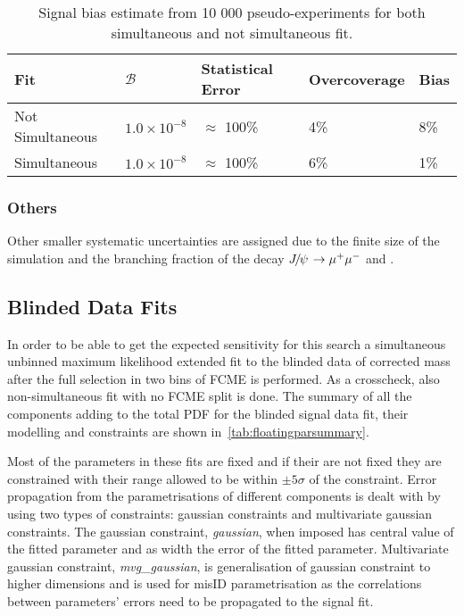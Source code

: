 \begin{table}[H]
\begin{center}
\begin{tabular}{| l | l | l | l | l |}
\hline
        Fit & $\mathcal{B}$ & Statistical Error & Overcoverage & Bias \\
\hline
        Not Simultaneous  & $1.0\times 10^{-8}$ & $\approx$ 100\% & 4\% & 8\%   \\
        Simultaneous  & $1.0\times 10^{-8}$ & $\approx$ 100\% & 6\% & 1\%   \\
\hline
\end{tabular}
\end{center}
\caption{Signal bias estimate from 10 000 pseudo-experiments for both simultaneous and not simultaneous fit.}
\label{tab:biassum}
\end{table}


\subsubsection{Others}
Other smaller systematic uncertainties are assigned due to the finite size of the simulation and the branching fraction of the decay ${{J\mskip -3mu/\mskip -2mu\psi\mskip 2mu}} \rightarrow {\ensuremath{\mu^+\mu^-}}$ and \bjpsik.



\subsection{Blinded Data Fits}
\label{blindeddatafit}
In order to be able to get the expected sensitivity for this search a simultaneous unbinned maximum likelihood extended fit to the blinded data of corrected mass after the full selection in two bins of FCME is performed. As a crosscheck, also non-simultaneous fit with no FCME split is done. The summary of all the components adding to the total PDF for the blinded signal data fit, their modelling and constraints are shown in~\autoref{tab:floatingparsummary}.

Most of the parameters in these fits are fixed and if their are not fixed they are constrained with their range allowed to be within $\pm5\sigma$ of the constraint. Error propagation from the parametrisations of different components is dealt with by using two types of constraints: gaussian constraints and multivariate gaussian constraints. The gaussian constraint, \textit{gaussian}, when imposed has central value of the fitted parameter and as width the error of the fitted parameter. Multivariate gaussian constraint, \textit{mvg\_gaussian}, is generalisation of gaussian constraint to higher dimensions and is used for misID parametrisation as the correlations between parameters' errors need to be propagated to the signal fit.


